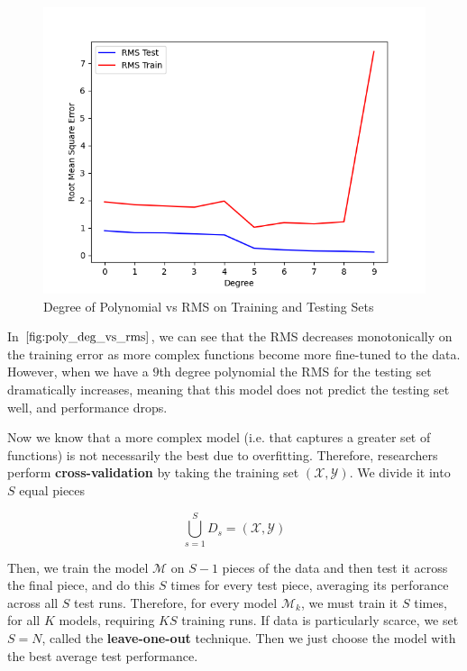 \documentclass{article}
\theoremstyle{definition}
\begin{document}
      \begin{figure}[hbt!]
        \centering
        \includegraphics[scale=0.4]{img/Degree_vs_RMS.png}
        \caption{Degree of Polynomial vs RMS on Training and Testing Sets}
        \label{fig:poly_deg_vs_rms}
      \end{figure}

      In $\ref{fig:poly_deg_vs_rms}$, we can see that the RMS decreases monotonically on the training error as more complex functions become more fine-tuned to the data. However, when we have a $9$th degree polynomial the RMS for the testing set dramatically increases, meaning that this model does not predict the testing set well, and performance drops. 

      Now we know that a more complex model (i.e. that captures a greater set of functions) is not necessarily the best due to overfitting. Therefore, researchers perform \textbf{cross-validation} by taking the training set $(\mathcal{X}, \mathcal{Y})$. We divide it into $S$ equal pieces 

        \[\bigcup_{s=1}^S D_s = (\mathcal{X}, \mathcal{Y})\]

      Then, we train the model $\mathcal{M}$ on $S-1$ pieces of the data and then test it across the final piece, and do this $S$ times for every test piece, averaging its perforance across all $S$ test runs. Therefore, for every model $\mathcal{M}_k$, we must train it $S$ times, for all $K$ models, requiring $KS$ training runs. If data is particularly scarce, we set $S = N$, called the \textbf{leave-one-out} technique. Then we just choose the model with the best average test performance. 
\end{document}
